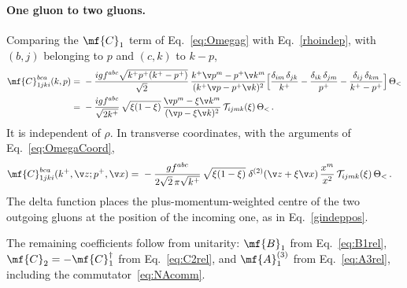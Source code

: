 \paragraph{One gluon to two gluons.}
Comparing the $\mf{C}_{1}$ term of Eq.~\eqref{eq:Omegag} with Eq.~\eqref{rhoindep}, with $(b,j)$ belonging to
$p$ and $(c,k)$ to $k-p$,
\begin{align}\label{C1coeffM}
\mf{C}^{bca}_{1jki}(k,p)=\ &-\frac{igf^{abc}\sqrt{k^{+}p^{+}(k^{+}-p^{+})}}{\sqrt{2}}\,
\frac{k^{+}\v p^{m}-p^{+}\v k^{m}}{(k^{+}\v p-p^{+}\v k)^{2}}
\Big[\frac{\delta_{im}\,\delta_{jk}}{k^{+}}-\frac{\delta_{ik}\,\delta_{jm}}{p^{+}}-\frac{\delta_{ij}\,\delta_{km}}{k^{+}-p^{+}}\Big]\,
\Theta_{<}\notag\\
=\ &-\frac{igf^{abc}}{\sqrt{2k^{+}}}\,\sqrt{\xi(1-\xi)}\,\frac{\v p^{m}-\xi\v k^{m}}{(\v p-\xi\v k)^{2}}\,
\mathcal{T}_{ijmk}(\xi)\,\Theta_{<}\,.
\end{align}
It is independent of $\rho$. In transverse coordinates, with the arguments of
Eq.~\eqref{eq:OmegaCoord},
\begin{align}\label{C1coeffX}
\mf{C}^{bca}_{1jki}(k^{+},\v z;p^{+},\v x)=\ &-\frac{gf^{abc}}{2\sqrt{2}\,\pi\sqrt{k^{+}}}\,\sqrt{\xi(1-\xi)}\;
\delta^{(2)}(\v z+\xi\v x)\,\frac{x^{m}}{x^{2}}\,\mathcal{T}_{ijmk}(\xi)\,\Theta_{<}\,.
\end{align}
The delta function places the plus-momentum-weighted centre of the two outgoing gluons at the position
of the incoming one, as in Eq.~\eqref{gindeppos}.

The remaining coefficients follow from unitarity: $\mf{B}_{1}$ from Eq.~\eqref{eq:B1rel},
$\mf{C}_{2}=-\mf{C}^{\dagger}_{1}$ from Eq.~\eqref{eq:C2rel}, and $\mf{A}^{(3)}_{1}$ from Eq.~\eqref{eq:A3rel},
including the commutator~\eqref{eq:NAcomm}.
